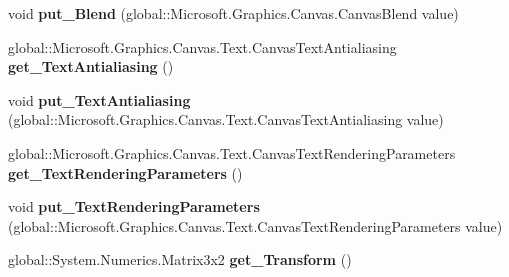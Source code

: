 \begin{DoxyCompactItemize}
\item 
\mbox{\label{class_microsoft_1_1_graphics_1_1_canvas_1_1_canvas_drawing_session_aa6c91c25f9b08acbdea5066bb53e564e}} 
void {\bfseries put\+\_\+\+Blend} (global\+::\+Microsoft.\+Graphics.\+Canvas.\+Canvas\+Blend value)
\item 
\mbox{\label{class_microsoft_1_1_graphics_1_1_canvas_1_1_canvas_drawing_session_a10f396358c7e8a2bacb1fee9dd5d4e7d}} 
global\+::\+Microsoft.\+Graphics.\+Canvas.\+Text.\+Canvas\+Text\+Antialiasing {\bfseries get\+\_\+\+Text\+Antialiasing} ()
\item 
\mbox{\label{class_microsoft_1_1_graphics_1_1_canvas_1_1_canvas_drawing_session_a66f5415d3bdfca1acb7959637e990933}} 
void {\bfseries put\+\_\+\+Text\+Antialiasing} (global\+::\+Microsoft.\+Graphics.\+Canvas.\+Text.\+Canvas\+Text\+Antialiasing value)
\item 
\mbox{\label{class_microsoft_1_1_graphics_1_1_canvas_1_1_canvas_drawing_session_abb03351b4efecdbde83c55547f05de3e}} 
global\+::\+Microsoft.\+Graphics.\+Canvas.\+Text.\+Canvas\+Text\+Rendering\+Parameters {\bfseries get\+\_\+\+Text\+Rendering\+Parameters} ()
\item 
\mbox{\label{class_microsoft_1_1_graphics_1_1_canvas_1_1_canvas_drawing_session_aa349f61b04c1a61331c6c070f7040576}} 
void {\bfseries put\+\_\+\+Text\+Rendering\+Parameters} (global\+::\+Microsoft.\+Graphics.\+Canvas.\+Text.\+Canvas\+Text\+Rendering\+Parameters value)
\item 
\mbox{\label{class_microsoft_1_1_graphics_1_1_canvas_1_1_canvas_drawing_session_a9a70127628e9bd7cf6376f00aec663e4}} 
global\+::\+System.\+Numerics.\+Matrix3x2 {\bfseries get\+\_\+\+Transform} ()
\item 
\mbox{\label{class_microsoft_1_1_graphics_1_1_canvas_1_1_canvas_drawing_session_a7b5b08f163e7d4ae34e9fb705549248a}} 

\end{DoxyCompactItemize}

